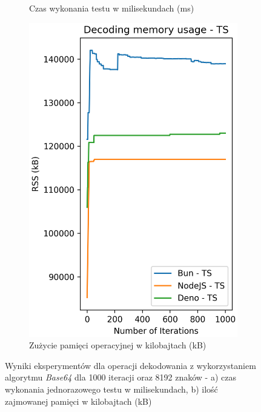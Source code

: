 \begin{figure}[H]
\begin{subfigure}[b]{0.44\textwidth}
    \caption{Czas wykonania testu w milisekundach (ms)}
    \label{fig:decoding_e2_ts_time}
  \end{subfigure}
  \begin{subfigure}[b]{0.44\textwidth}
    \centering
    \includegraphics[width=\textwidth]{Figures/coding/base64_1000_decoding_ts_memory.png}
    \caption{Zużycie pamięci operacyjnej w kilobajtach (kB)}
    \label{fig:decoding_e2_ts_memory}
  \end{subfigure}
  \hfill
  \caption{Wyniki eksperymentów dla operacji dekodowania z wykorzystaniem algorytmu \textit{Base64} dla 1000 iteracji oraz 8192 znaków - a) czas wykonania jednorazowego testu w milisekundach, b) ilość zajmowanej pamięci w kilobajtach (kB)}
  \label{fig:decoding_e2_ts}
\end{figure}

